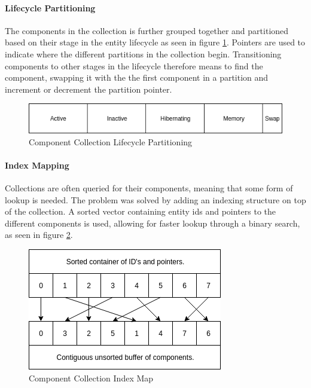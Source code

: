 \paragraph{Lifecycle Partitioning}
The components in the collection is further grouped together and partitioned based on their stage
in the entity lifecycle as seen in figure \ref{fig:component_collection_partitioning}.
Pointers are used to indicate where the different partitions in the collection begin.
Transitioning components to other stages in the lifecycle therefore means to find the component,
swapping it with the the first component in a partition and increment or decrement the partition pointer.

\begin{figure}[tbp]
    \begin{center}
    \includegraphics[scale=0.45]{images/component_collection_partitioning.png}
    \caption{Component Collection Lifecycle Partitioning}
    \label{fig:component_collection_partitioning}
    \end{center}
\end{figure}

\paragraph{Index Mapping}
Collections are often queried for their components, meaning that some form of lookup is needed.
The problem was solved by adding an indexing structure on top of the collection.
A sorted vector containing entity ids and pointers to the different components is used,
allowing for faster lookup through a binary search, as seen in figure \ref{fig:component_collection_index_map}.

\begin{figure}[tbp]
    \begin{center}
    \includegraphics[scale=0.45]{images/component_collection_index_map.png}
    \caption{Component Collection Index Map}
    \label{fig:component_collection_index_map}
    \end{center}
\end{figure}

